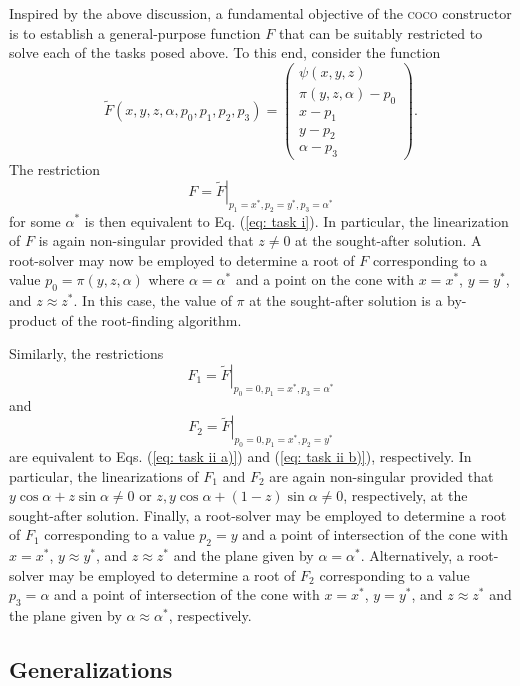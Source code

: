 \documentclass{article}
\begin{document}
Inspired by the above discussion, a fundamental objective of the \textsc{coco%
} constructor is to establish a general-purpose function $F$ that can be
suitably restricted to solve each of the tasks posed above. To this end,
consider the function%
\[
\tilde{F}\left( x,y,z,\alpha ,p_{0},p_{1},p_{2},p_{3}\right) =\left( 
\begin{array}{c}
\psi \left( x,y,z\right)  \\ 
\pi \left( y,z,\alpha \right) -p_{0} \\ 
x-p_{1} \\ 
y-p_{2} \\ 
\alpha -p_{3}%
\end{array}%
\right) .
\]%
The restriction 
\[
F=\left. \tilde{F}\right| _{p_{1}=x^{\ast },p_{2}=y^{\ast },p_{3}=\alpha
^{\ast }}
\]%
for some $\alpha ^{\ast }$ is then equivalent to Eq. (\ref{eq: task i}). In
particular, the linearization of $F$ is again non-singular provided that $%
z\neq 0$ at the sought-after solution. A root-solver may now be employed to
determine a root of $F$ corresponding to a value $p_{0}=\pi \left(
y,z,\alpha \right) $ where $\alpha =\alpha ^{\ast }$ and a point on the cone
with $x=x^{\ast }$, $y=y^{\ast }$, and $z\approx z^{\ast }$. In this case,
the value of $\pi $ at the sought-after solution is a by-product of the
root-finding algorithm.

Similarly, the restrictions 
\[
F_{1}=\left. \tilde{F}\right| _{p_{0}=0,p_{1}=x^{\ast },p_{3}=\alpha ^{\ast
}}
\]%
and 
\[
F_{2}=\left. \tilde{F}\right| _{p_{0}=0,p_{1}=x^{\ast },p_{2}=y^{\ast }}
\]%
are equivalent to Eqs. (\ref{eq: task ii a)}) and (\ref{eq: task ii b)}),
respectively. In particular, the linearizations of $F_{1}$ and $F_{2}$ are
again non-singular provided that $y\cos \alpha +z\sin \alpha \neq 0$ or $%
z,y\cos \alpha +\left( 1-z\right) \sin \alpha \neq 0$, respectively, at the
sought-after solution. Finally, a root-solver may be employed to determine a
root of $F_{1}$ corresponding to a value $p_{2}=y$ and a point of
intersection of the cone with $x=x^{\ast }$, $y\approx y^{\ast }$, and $%
z\approx z^{\ast }$ and the plane given by $\alpha =\alpha ^{\ast }$.
Alternatively, a root-solver may be employed to determine a root of $F_{2}$
corresponding to a value $p_{3}=\alpha $ and a point of intersection of the
cone with $x=x^{\ast }$, $y=y^{\ast }$, and $z\approx z^{\ast }$ and the
plane given by $\alpha \approx \alpha ^{\ast }$, respectively.

\subsection{Generalizations}
\end{document}

